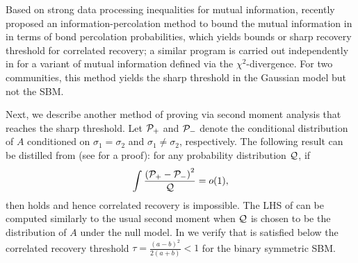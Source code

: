 Based on strong data processing inequalities for mutual information, recently \cite{PW18} proposed an information-percolation method to bound the mutual information in  in terms of bond percolation probabilities,
 which yields bounds or sharp recovery threshold for correlated recovery; a similar program is carried out independently in \cite{AB18} for a variant of mutual information defined via the $\chi^2$-divergence. For two communities, this method yields the sharp threshold 
in the Gaussian model but not the SBM.


Next, we describe another method of proving  via second moment analysis that reaches the sharp threshold. 
Let $\P_+$ and $\P_-$ denote the conditional distribution of $A$ conditioned on $\sigma_1=\sigma_2$ and $\sigma_1\neq\sigma_2$, respectively. 
The following result can be distilled from \cite{banks-etal-colt} (see  for a proof):
for any probability distribution $\Q$, if
\begin{align}
\int \frac{  \left( \P_{+}  - \P_{-} \right)^2 }{ \Q} =o(1), \label{eq:second_moment_conditional}
\end{align}
then  holds and hence correlated recovery is impossible. 
The LHS of  can be computed similarly to the usual second moment  when $\Q$ is chosen to be the distribution of $A$ under
 the null model.  
In  we verify that  is satisfied below the correlated recovery threshold $\tau=\frac{(a-b)^2}{2(a+b)}<1$ for the binary symmetric SBM. 




